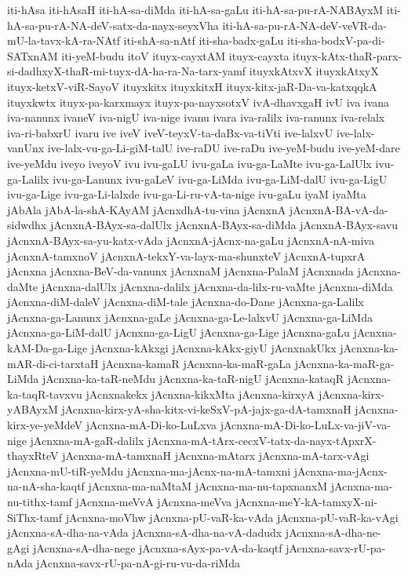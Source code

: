 {iti-hAsa
iti-hAsaH
iti-hA-sa-diMda
iti-hA-sa-gaLu
iti-hA-sa-pu-rA-NABAyxM
iti-hA-sa-pu-rA-NA-deV-satx-da-nayx-seyxVha
iti-hA-sa-pu-rA-NA-deV-veVR-da-mU-la-tavx-kA-ra-NAtf
iti-shA-sa-nAtf
iti-sha-badx-gaLu
iti-sha-bodxV-pa-di-SATxnAM
iti-yeM-budu
itoV
ituyx-cayxtAM
ituyx-cayxta
ituyx-kAtx-thaR-parx-si-dadhxyX-thaR-mi-tuyx-dA-ha-ra-Na-tarx-yamf
ituyxkAtxvX
ituyxkAtxyX
ituyx-ketxV-viR-SayoV
ituyxkitx
ituyxkitxH
ituyx-kitx-jaR-Da-va-katxqqkA
ituyxkwtx
ituyx-pa-karxmayx
ituyx-pa-nayxsotxV
ivA-dhavxgaH
ivU
iva
ivana
iva-nanunx
ivaneV
iva-nigU
iva-nige
ivanu
ivara
iva-ralilx
iva-ranunx
iva-relalx
iva-ri-babxrU
ivaru
ive
iveV
iveV-teyxV-ta-daBx-va-tiVti
ive-lalxvU
ive-lalx-vanUnx
ive-lalx-vu-ga-Li-giM-talU
ive-raDU
ive-raDu
ive-yeM-budu
ive-yeM-dare
ive-yeMdu
iveyo
iveyoV
ivu
ivu-gaLU
ivu-gaLa
ivu-ga-LaMte
ivu-ga-LalUlx
ivu-ga-Lalilx
ivu-ga-Lanunx
ivu-gaLeV
ivu-ga-LiMda
ivu-ga-LiM-dalU
ivu-ga-LigU
ivu-ga-Lige
ivu-ga-Li-lalxde
ivu-ga-Li-ru-vA-ta-nige
ivu-gaLu
iyaM
iyaMta
jAbAla
jAbA-la-shA-KAyAM
jAcnxdhA-tu-vina
jAcnxnA
jAcnxnA-BA-vA-da-sidwdhx
jAcnxnA-BAyx-sa-dalUlx
jAcnxnA-BAyx-sa-diMda
jAcnxnA-BAyx-savu
jAcnxnA-BAyx-sa-yu-katx-vAda
jAcnxnA-jAcnx-na-gaLu
jAcnxnA-nA-miva
jAcnxnA-tamxnoV
jAcnxnA-tekxY-va-layx-ma-shunxteV
jAcnxnA-tupxrA
jAcnxna
jAcnxna-BeV-da-vanunx
jAcnxnaM
jAcnxna-PalaM
jAcnxnada
jAcnxna-daMte
jAcnxna-dalUlx
jAcnxna-dalilx
jAcnxna-da-lilx-ru-vaMte
jAcnxna-diMda
jAcnxna-diM-daleV
jAcnxna-diM-tale
jAcnxna-do-Dane
jAcnxna-ga-Lalilx
jAcnxna-ga-Lanunx
jAcnxna-gaLe
jAcnxna-ga-Le-lalxvU
jAcnxna-ga-LiMda
jAcnxna-ga-LiM-dalU
jAcnxna-ga-LigU
jAcnxna-ga-Lige
jAcnxna-gaLu
jAcnxna-kAM-Da-ga-Lige
jAcnxna-kAkxgi
jAcnxna-kAkx-giyU
jAcnxnakUkx
jAcnxna-ka-mAR-di-ci-tarxtaH
jAcnxna-kamaR
jAcnxna-ka-maR-gaLa
jAcnxna-ka-maR-ga-LiMda
jAcnxna-ka-taR-neMdu
jAcnxna-ka-taR-nigU
jAcnxna-kataqR
jAcnxna-ka-taqR-tavxvu
jAcnxnakekx
jAcnxna-kikxMta
jAcnxna-kirxyA
jAcnxna-kirx-yABAyxM
jAcnxna-kirx-yA-sha-kitx-vi-keSxV-pA-jajx-ga-dA-tamxnaH
jAcnxna-kirx-ye-yeMdeV
jAcnxna-mA-Di-ko-LuLxva
jAcnxna-mA-Di-ko-LuLx-va-jiV-va-nige
jAcnxna-mA-gaR-dalilx
jAcnxna-mA-tArx-cecxV-tatx-da-nayx-tApxrX-thayxRteV
jAcnxna-mA-tamxnaH
jAcnxna-mAtarx
jAcnxna-mA-tarx-vAgi
jAcnxna-mU-tiR-yeMdu
jAcnxna-ma-jAcnx-na-mA-tamxni
jAcnxna-ma-jAcnx-na-nA-sha-kaqtf
jAcnxna-ma-naMtaM
jAcnxna-ma-nu-tapxnanxM
jAcnxna-ma-nu-tithx-tamf
jAcnxna-meVvA
jAcnxna-meVva
jAcnxna-meY-kA-tamxyX-ni-SiThx-tamf
jAcnxna-moVhw
jAcnxna-pU-vaR-ka-vAda
jAcnxna-pU-vaR-ka-vAgi
jAcnxna-sA-dha-na-vAda
jAcnxna-sA-dha-na-vA-dadudx
jAcnxna-sA-dha-ne-gAgi
jAcnxna-sA-dha-nege
jAcnxna-sAyx-pa-vA-da-kaqtf
jAcnxna-savx-rU-pa-nAda
jAcnxna-savx-rU-pa-nA-gi-ru-vu-da-riMda
}
